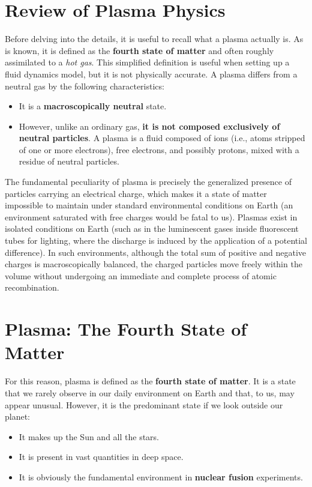 \section{Review of Plasma Physics}
Before delving into the details, it is useful to recall what a plasma actually is. As is known, it is defined as the \textbf{fourth state of matter} and often roughly assimilated to a \textit{hot gas}. This simplified definition is useful when setting up a fluid dynamics model, but it is not physically accurate. A plasma differs from a neutral gas by the following characteristics:\begin{itemize}\item It is a \textbf{macroscopically neutral} state.\item However, unlike an ordinary gas, \textbf{it is not composed exclusively of neutral particles}. A plasma is a fluid composed of ions (i.e., atoms stripped of one or more electrons), free electrons, and possibly protons, mixed with a residue of neutral particles.\end{itemize}The fundamental peculiarity of plasma is precisely the generalized presence of particles carrying an electrical charge, which makes it a state of matter impossible to maintain under standard environmental conditions on Earth (an environment saturated with free charges would be fatal to us). Plasmas exist in isolated conditions on Earth (such as in the luminescent gases inside fluorescent tubes for lighting, where the discharge is induced by the application of a potential difference). In such environments, although the total sum of positive and negative charges is macroscopically balanced, the charged particles move freely within the volume without undergoing an immediate and complete process of atomic recombination.

\section{Plasma: The Fourth State of Matter}

For this reason, plasma is defined as the \textbf{fourth state of matter}. It is a state that we rarely observe in our daily environment on Earth and that, to us, may appear unusual. However, it is the predominant state if we look outside our planet:

\begin{itemize}
    \item It makes up the Sun and all the stars.
    \item It is present in vast quantities in deep space.
    \item It is obviously the fundamental environment in \textbf{nuclear fusion} experiments.
\end{itemize}

